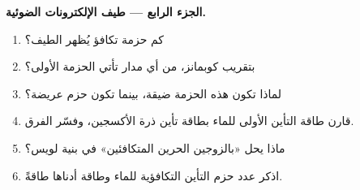 \begin{problem}
\medskip
\noindent\textbf{الجزء الرابع --- طيف الإلكترونات الضوئية.}
\begin{enumerate}[resume]
  \item كم حزمة تكافؤ يُظهر الطيف؟
  \item بتقريب كوبمانز، من أي مدار تأتي الحزمة الأولى؟
  \item لماذا تكون هذه الحزمة ضيقة، بينما تكون حزم  عريضة؟
  \item قارن طاقة التأين الأولى للماء بطاقة تأين ذرة
        الأكسجين، وفسّر الفرق.
  \item ماذا يحل «بالزوجين الحرين المتكافئين» في بنية لويس؟
  \item اذكر عدد حزم التأين التكافؤية للماء وطاقة
        أدناها طاقةً.
\end{enumerate}
\end{problem}
